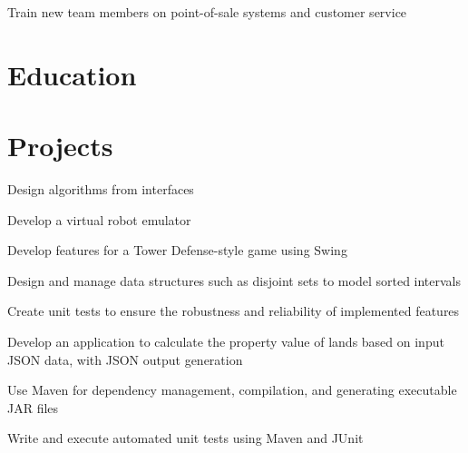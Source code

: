 \documentclass[letterpaper,10pt]{article}
\begin{document}
  \begin{resume_list}
    \item Train new team members on point-of-sale systems and customer service
  \end{resume_list}


  \section{Education}

  \vspace{10pt}
  \pagebreak


  \section{Projects}

  \begin{resume_list}
    \item Design algorithms from interfaces
    \vspace{2pt}
    \item Develop a virtual robot emulator
    \vspace{2pt}
    \item Develop features for a Tower Defense-style game using Swing
    \vspace{2pt}
    \item Design and manage data structures such as disjoint sets to model sorted intervals
    \vspace{2pt}
    \item Create unit tests to ensure the robustness and reliability of implemented features
    
  \end{resume_list}

  \begin{resume_list}
    \item Develop an application to calculate the property value of lands based on input JSON data, with JSON output generation
    \vspace{2pt}
    \item Use Maven for dependency management, compilation, and generating executable JAR files
    \vspace{2pt}
    \item Write and execute automated unit tests using Maven and JUnit
  \end{resume_list}
  
\end{document}
